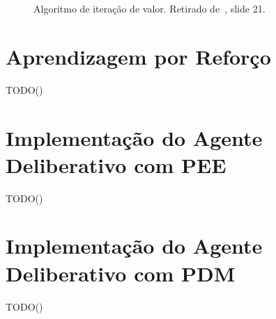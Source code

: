 \begin{figure}[H]
    \begin{center}
    \end{center}
    \caption{Algoritmo de iteração de valor.
    Retirado de~\cite{isel:iasa:slides:processos-decisao-sequencial}, slide 21.}
    \label{fig:algoritmo-iteracao-valor}
\end{figure}

\section{Aprendizagem por Reforço}\label{sec:aprendizagem-por-reforco}

TODO()

\section{Implementação do Agente Deliberativo com PEE}\label{sec:implementacao-agente-deliberativo-com-pee}
TODO()


\section{Implementação do Agente Deliberativo com PDM}\label{sec:implementacao-agente-deliberativo-com-pdm}
TODO()
